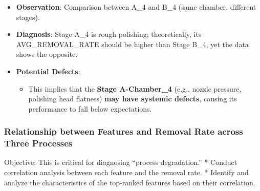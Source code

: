 \documentclass[11pt]{article}
\providecommand{\tightlist}{%
      \setlength{\itemsep}{0pt}\setlength{\parskip}{0pt}}
\begin{document}
\begin{itemize}
\tightlist
\item
  \textbf{Observation}: Comparison between A\_4 and B\_4 (same chamber,
  different stages).
\item
  \textbf{Diagnosis}: Stage A\_4 is rough polishing; theoretically, its
  AVG\_REMOVAL\_RATE should be higher than Stage B\_4, yet the data
  shows the opposite.
\item
  \textbf{Potential Defects}:

  \begin{itemize}
  \tightlist
  \item
    This implies that the \textbf{Stage A-Chamber\_4} (e.g., nozzle
    pressure, polishing head flatness) \textbf{may have systemic
    defects}, causing its performance to fall below expectations.
  \end{itemize}
\end{itemize}

    \subsubsection{Relationship between Features and Removal Rate across
Three
Processes}\label{relationship-between-features-and-removal-rate-across-three-processes}

Objective: This is critical for diagnosing ``process degradation.'' *
Conduct correlation analysis between each feature and the removal rate.
* Identify and analyze the characteristics of the top-ranked features
based on their correlation.
\end{document}
